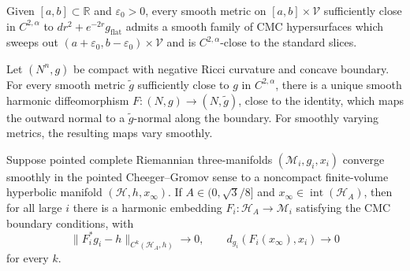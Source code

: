 \begin{proposition}
\label{prop:chow-iv-cmc-sweepout-almost-cusp}
Given \([a,b]\subset\mathbb R\) and \(\varepsilon_0>0\), every smooth metric
on \([a,b]\times\mathcal V\) sufficiently close in \(C^{2,\alpha}\) to
\(dr^2+e^{-2r}g_{\mathrm{flat}}\) admits a smooth family of CMC hypersurfaces
which sweeps out \((a+\varepsilon_0,b-\varepsilon_0)\times\mathcal V\) and is
\(C^{2,\alpha}\)-close to the standard slices.
\end{proposition}

\begin{proposition}
\label{prop:chow-iv-harmonic-maps-near-identity}
Let \((N^n,g)\) be compact with negative Ricci curvature and concave boundary.
For every smooth metric \(\widetilde g\) sufficiently close to \(g\) in
\(C^{2,\alpha}\), there is a unique smooth harmonic diffeomorphism
\(F:(N,g)\to(N,\widetilde g)\), close to the identity, which maps the outward
normal to a \(\widetilde g\)-normal along the boundary.  For smoothly varying
metrics, the resulting maps vary smoothly.
\end{proposition}

\begin{proposition}
\label{prop:chow-iv-harmonic-parametrizations}
Suppose pointed complete Riemannian three-manifolds
\((\mathcal M_i,g_i,x_i)\) converge smoothly in the pointed Cheeger--Gromov
sense to a noncompact finite-volume hyperbolic manifold
\((\mathcal H,h,x_\infty)\).  If \(A\in(0,\sqrt3/8]\) and
\(x_\infty\in\operatorname{int}(\mathcal H_A)\), then for all large \(i\)
there is a harmonic embedding \(F_i:\mathcal H_A\to\mathcal M_i\) satisfying
the CMC boundary conditions, with
\[
 \|F_i^*g_i-h\|_{C^k(\mathcal H_A,h)}\longrightarrow0,
 \qquad d_{g_i}(F_i(x_\infty),x_i)\longrightarrow0
\]
for every \(k\).
\end{proposition}


